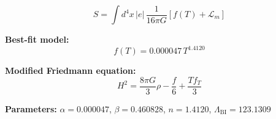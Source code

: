 
\begin{equation}
  S = \int d^4x \, |e| \, \frac{1}{16\pi G} \left[ f(T) + \mathcal{L}_m \right]
\end{equation}

\textbf{Best-fit model:}
\begin{equation}
  f(T) = 0.000047 \, T^{1.4120}
\end{equation}

\textbf{Modified Friedmann equation:}
\begin{equation}
  H^2 = \frac{8\pi G}{3} \rho - \frac{f}{6} + \frac{T f_T}{3}
\end{equation}

\textbf{Parameters:}
$\alpha = 0.000047$, \quad
$\beta = 0.460828$, \quad
$n = 1.4120$, \quad
$\Lambda_{\text{BI}} = 123.1309$